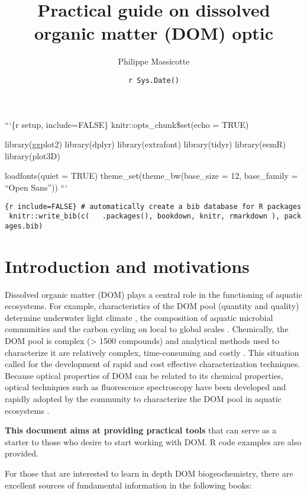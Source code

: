 \documentclass[]{book}
\title{Practical guide on dissolved organic matter (DOM) optic}
\author{Philippe Massicotte}
\date{\texttt{r\ Sys.Date()}}
\theoremstyle{definition}
\theoremstyle{definition}
\theoremstyle{remark}
\begin{document}
\maketitle

{
\setcounter{tocdepth}{1}
\tableofcontents
}
```\{r setup, include=FALSE\} knitr::opts\_chunk\$set(echo = TRUE)

library(ggplot2) library(dplyr) library(extrafont) library(tidyr)
library(eemR) library(plot3D)

loadfonts(quiet = TRUE) theme\_set(theme\_bw(base\_size = 12,
base\_family = ``Open Sans'')) ```

\texttt{\{r\ include=FALSE\}\ \#\ automatically\ create\ a\ bib\ database\ for\ R\ packages\ knitr::write\_bib(c(\ \ \ .packages(),\ \textquotesingle{}bookdown\textquotesingle{},\ \textquotesingle{}knitr\textquotesingle{},\ \textquotesingle{}rmarkdown\textquotesingle{}\ ),\ \textquotesingle{}packages.bib\textquotesingle{})}

\chapter{Introduction and
motivations}\label{introduction-and-motivations}

Dissolved organic matter (DOM) plays a central role in the functioning
of aquatic ecosystems. For example, characteristics of the DOM pool
(quantity and quality) determine underwater light climate
\citep{Kirk1994}, the composition of aquatic microbial communities
\citep{Foreman2003, Kritzberg2006a} and the carbon cycling on local to
global scales \citep{Cole2007}. Chemically, the DOM pool is complex
(\textgreater{} 1500 compounds) and analytical methods used to
characterize it are relatively complex, time-consuming and costly
\citep{Benner2002, Seitzinger2005, Fellman2010}. This situation called
for the development of rapid and cost effective characterization
techniques. Because optical properties of DOM can be related to its
chemical properties, optical techniques such as fluorescence
spectroscopy have been developed and rapidly adopted by the community to
characterize the DOM pool in aquatic ecosystems
\citep{Coble1990, Coble1996, McKnight2001, Fellman2008}.

\textbf{This document aims at providing practical tools} that can serve
as a starter to those who desire to start working with DOM. R code
examples are also provided.

For those that are interested to learn in depth DOM biogeochemistry,
there are excellent sources of fundamental information in the following
books:
\end{document}
